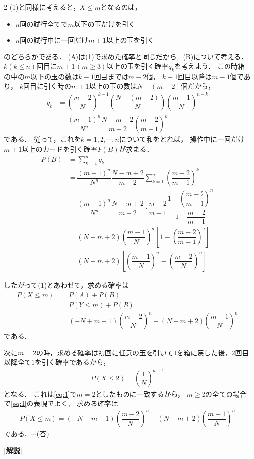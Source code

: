 \documentclass[../../main.tex]{subfiles}
\begin{document}
\begin{multicols}{2}
  (1)と同様に考えると，$X\le m$となるのは，
  \begin{itemize}
    \item[A] $n$回の試行全てで$m$以下の玉だけを引く
    \item[B] $n$回の試行中に一回だけ$m+1$以上の玉を引く
  \end{itemize}
  のどちらかである．
  (A)は(1)で求めた確率と同じだから，(B)について考える．
  $k(k \le n)$回目に$m+1\, (m \ge 3)$以上の玉を引く確率$q_k$を考えよう．
  この時箱の中の$m$以下の玉の数は$k-1$回目までは$m-2$個，
  $k+1$回目以降は$m-1$個であり，
  $k$回目に引く時の$m+1$以上の玉の数は$N-(m-2)$個だから，
  \begin{align}
    q_k
    & = \left( \dfrac{m-2}{N} \right)^{k-1} \left( \dfrac{N-(m-2)}{N} \right)\left( \dfrac{m-1}{N} \right)^{n-k} \\
    & = \dfrac{(m-1)^{n}}{N^n}\dfrac{N-m+2}{m-2} \left(\dfrac{m-2}{m-1}\right)^{k}
  \end{align}
  である．
  従って，これを$k=1,2,\cdots,n$について和をとれば，
  操作中に一回だけ$m+1$以上のカードを引く確率$P(B)$が求まる．
  \begin{align}
    P(B)
    & = \sum_{k=1}^{n}q_k                                                                                                         \\
    & = \dfrac{(m-1)^{n}}{N^n}\dfrac{N-m+2}{m-2} \sum_{k=1}^{n}\left(\dfrac{m-2}{m-1}\right)^{k}                                     \\
    & = \dfrac{(m-1)^n}{N^n}  \dfrac{N-m+2}{m-2} \cdot \dfrac{m-2}{m-1} \dfrac{1 - \left(\dfrac{m-2}{m-1}\right)^n}{1-\dfrac{m-2}{m-1}} \\
    & = (N-m+2) \left( \dfrac{m-1}{N} \right)^n \left[1- \left( \dfrac{m-2}{m-1} \right)^n\right]                                   \\
    & = (N-m+2) \left[\left( \dfrac{m-1}{N} \right)^n - \left( \dfrac{m-2}{N} \right)^n \right]
  \end{align}

  したがって(1)とあわせて，求める確率は
  \begin{align}
    P(X \le m)
    & = P(A)+P(B) \\
    & = P(Y \le m) + P(B) \\
    & = (-N+m-1) \left( \dfrac{m-2}{N} \right)^n + (N-m+2) \left( \dfrac{m-1}{N} \right)^n \label{eq:1}
  \end{align}
  である．

  次に$m=2$の時，求める確率は初回に任意の玉を引いて$1$を箱に戻した後，$2$回目以降全て$1$を引く確率であるから，
  \begin{align}
    P(X\le 2) = \left( \dfrac{1}{N} \right)^{n-1}
  \end{align}
  となる．
  これは\cref{eq:1}で$m=2$としたものに一致するから，
  $m\ge 2$の全ての場合で\cref{eq:1}の表現でよく，
  求める確率は
  \begin{align}
    P(X \le m) = (-N+m-1) \left( \dfrac{m-2}{N} \right)^n + (N-m+2) \left( \dfrac{m-1}{N} \right)^n
  \end{align}
  である．$\cdots$(答)

  {\bf [解説]}

  \newpage
\end{multicols}
\end{document}
